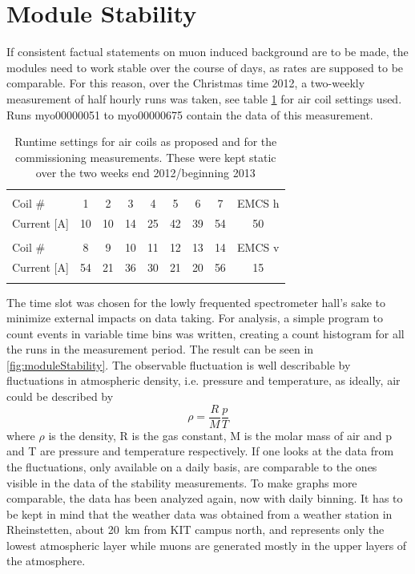   \section{Module Stability}
  \label{ch:Analysis:sec:Module Stability}
  If consistent factual statements on muon induced background are to be made, the modules need to work stable over the course of days, as rates are supposed to be comparable. For this reason, over the Christmas time 2012, a two-weekly measurement of half hourly runs was taken, see table \ref{tab:airCoilSettingsChristmas} for air coil settings used. Runs myo00000051 to myo00000675 contain the data of this measurement.
  \begin{table}
  \centering
   \begin{tabular}{|l|ccccccc|c|}
    \hline
    &&&&&&&&\\
    Coil \#	&1	&2	&3	&4	&5	&6	&7	&EMCS h	\\
    Current [A]	&10	&10	&14	&25	&42	&39	&54	&50  	\\
    &&&&&&&&\\
    Coil \# 	&8	&9	&10	&11	&12	&13	&14	&EMCS v	\\
    Current [A]	&54	&21	&36	&30	&21	&20	&56	&15    	\\
    &&&&&&&&\\
    \hline
   \end{tabular}
  \caption[LFCS settings stability measurement]{Runtime settings for air coils as proposed and for the commissioning measurements. These were kept static over the two weeks end 2012/beginning 2013}
  \label{tab:airCoilSettingsChristmas}
  \end{table}
  The time slot was chosen for the lowly frequented spectrometer hall's sake to minimize external impacts on data taking. For analysis, a simple program to count events in variable time bins was written, creating a count histogram for all the runs in the measurement period. The result can be seen in \ref{fig:moduleStability}. The observable fluctuation is well describable by fluctuations in atmospheric density, i.e. pressure and temperature, as ideally, air could be described by
  \begin{equation}
  	\rho = \frac{R}{M}\frac{p}{T}
  \end{equation}
  where $\rho$ is the density, R is the gas constant, M is the molar mass of air and p and T are pressure and temperature respectively.
  If one looks at the data from \cite{wetterCom} the fluctuations, only available on a daily basis, are comparable to the ones visible in the data of the stability measurements. To make graphs more comparable, the data has been analyzed again, now with daily binning. It has to be kept in mind that the weather data was obtained from a weather station in Rheinstetten, about \SI{20}{\kilo\meter} from KIT campus north, and represents only the lowest atmospheric layer while muons are generated mostly in the upper layers of the atmosphere.

